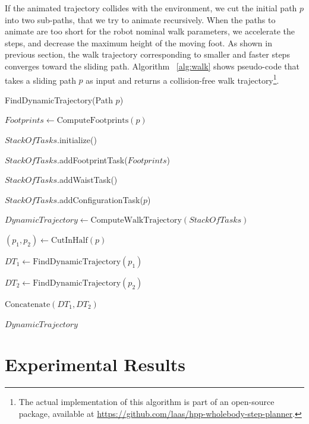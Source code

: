 \documentclass{article}
\begin{document}
If the animated  trajectory collides with the environment,  we cut the
initial  path   $p$  into  two   sub-paths,  that  we  try   to  animate
recursively. When the  paths to animate are too  short for the robot
nominal  walk parameters, we  accelerate the  steps, and  decrease the
maximum height of  the moving foot. As shown  in previous section, the
walk trajectory  corresponding to  smaller and faster  steps converges
toward the  sliding path.  Algorithm ~\ref{alg:walk} shows pseudo-code
that takes  a sliding path $p$  as input and  returns a collision-free
walk trajectory\footnote{The actual implementation of this algorithm is
part of an open-source package, available at
\url{https://github.com/laas/hpp-wholebody-step-planner}.}.

\begin{algorithm}[h]
\caption{FindDynamicTrajectory(Path $p$)}
\label{alg:walk}
\begin{algorithmic}
\STATE $Footprints \leftarrow \text{ComputeFootprints}(p)$

\STATE $StackOfTasks$.initialize()

\STATE $StackOfTasks$.addFootprintTask($Footprints$)

\STATE $StackOfTasks$.addWaistTask()

\STATE $StackOfTasks$.addConfigurationTask($p$)

\STATE $DynamicTrajectory \leftarrow
\text{ComputeWalkTrajectory}(StackOfTasks)$


\STATE $(p_1,p_2) \leftarrow \text{CutInHalf}(p)$

\STATE $DT_1 \leftarrow \text{FindDynamicTrajectory}(p_1)$

\STATE $DT_2 \leftarrow \text{FindDynamicTrajectory}(p_2)$

\RETURN $\text{Concatenate}(DT_1,DT_2)$

\ELSE

\RETURN $DynamicTrajectory$

\ENDIF
\end{algorithmic}
\end{algorithm}





\section{Experimental Results}

\label{sec:exp}
\end{document}
